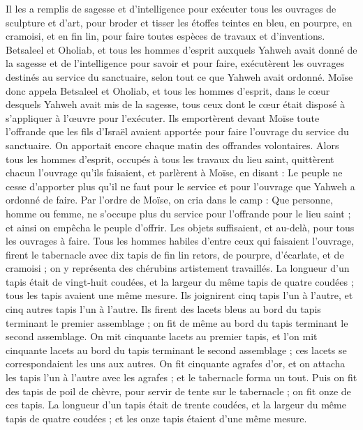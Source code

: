 \begin{multicols}{2}
Il les a remplis de sagesse et d’intelligence pour exécuter tous les ouvrages de sculpture et d’art, pour broder et tisser les étoffes teintes en bleu, en pourpre, en cramoisi, et en fin lin, pour faire toutes espèces de travaux et d’inventions\FTNT{}.
\VerseOne{}Betsaleel et Oholiab, et tous les hommes d'esprit auxquels Yahweh avait donné de la sagesse et de l'intelligence pour savoir et pour faire, exécutèrent les ouvrages destinés au service du sanctuaire, selon tout ce que Yahweh avait ordonné.
Moïse donc appela Betsaleel et Oholiab, et tous les hommes d'esprit, dans le cœur desquels Yahweh avait mis de la sagesse, tous ceux dont le cœur était disposé à s’appliquer à l’œuvre pour l’exécuter.
Ils emportèrent devant Moïse toute l'offrande que les fils d'Israël avaient apportée pour faire l'ouvrage du service du sanctuaire. On apportait encore chaque matin des offrandes volontaires.
Alors tous les hommes d’esprit, occupés à tous les travaux du lieu saint, quittèrent chacun l’ouvrage qu’ils faisaient,
et parlèrent à Moïse, en disant : Le peuple ne cesse d'apporter plus qu'il ne faut pour le service et pour l'ouvrage que Yahweh a ordonné de faire.
Par l’ordre de Moïse, on cria dans le camp : Que personne, homme ou femme, ne s’occupe plus du service pour l'offrande pour le lieu saint ; et ainsi on empêcha le peuple d'offrir.
Les objets suffisaient, et au-delà, pour tous les ouvrages à faire.
Tous les hommes habiles d'entre ceux qui faisaient l'ouvrage, firent le tabernacle avec dix tapis de fin lin retors, de pourpre, d'écarlate, et de cramoisi ; on y représenta des chérubins artistement travaillés.
La longueur d'un tapis était de vingt-huit coudées, et la largeur du même tapis de quatre coudées ; tous les tapis avaient une même mesure\FTNT{}.
Ils joignirent cinq tapis l'un à l'autre, et cinq autres tapis l'un à l'autre.
Ils firent des lacets bleus au bord du tapis terminant le premier assemblage ; on fit de même au bord du tapis terminant le second assemblage.
On mit cinquante lacets au premier tapis, et l’on mit cinquante lacets au bord du tapis terminant le second assemblage ; ces lacets se correspondaient les uns aux autres.
On fit cinquante agrafes d'or, et on attacha les tapis l'un à l'autre avec les agrafes ; et le tabernacle forma un tout.
Puis on fit des tapis de poil de chèvre, pour servir de tente sur le tabernacle ; on fit onze de ces tapis.
La longueur d'un tapis était de trente coudées, et la largeur du même tapis de quatre coudées ; et les onze tapis étaient d'une même mesure.

\end{multicols}
